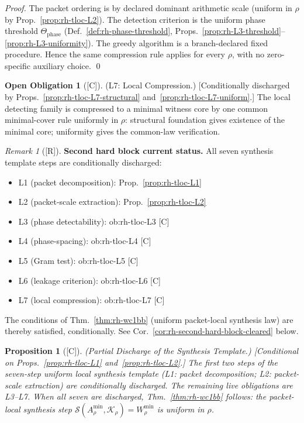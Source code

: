 \documentclass[12pt,oneside]{amsbook}
\theoremstyle{plain}
\newtheorem{proposition}[theorem]{Proposition}
\theoremstyle{definition}
\newtheorem{obligation}[theorem]{Open Obligation}
\theoremstyle{remark}
\newtheorem{remark}[theorem]{Remark}
\newcommand{\status}[1]{\textup{[#1]}}
\begin{document}
\begin{proof}
The packet ordering is by declared dominant arithmetic scale
(uniform in $\rho$ by Prop.~\ref{prop:rh-tloc-L2}). The detection
criterion is the uniform phase threshold
$\Theta_{\mathrm{phase}}$ (Def.~\ref{def:rh-phase-threshold},
Props.~\ref{prop:rh-L3-threshold}--\ref{prop:rh-L3-uniformity}).
The greedy algorithm is a branch-declared fixed procedure. Hence
the same compression rule applies for every $\rho$,
with no zero-specific auxiliary choice. \qed
\end{proof}

\begin{obligation}[\status{C}]\label{ob:rh-tloc-L7}
\textup{(L7: Local Compression.)}
\textup{[Conditionally discharged by
Props.~\ref{prop:rh-tloc-L7-structural}
and~\ref{prop:rh-tloc-L7-uniform}.]}
The local detecting family is compressed to a minimal witness core by
one common minimal-cover rule uniformly in $\rho$: structural
foundation gives existence of the minimal core; uniformity gives the
common-law verification.
\end{obligation}

\begin{remark}[\status{R}]\label{rem:rh-second-hinge-status}
\textbf{Second hard block current status.}
All seven synthesis template steps are conditionally discharged:
\begin{itemize}
 \item L1 (packet decomposition): Prop.~\ref{prop:rh-tloc-L1} \checkmark
 \item L2 (packet-scale extraction): Prop.~\ref{prop:rh-tloc-L2} \checkmark
 \item L3 (phase detectability): ob:rh-tloc-L3 [C] \checkmark
 \item L4 (phase-spacing): ob:rh-tloc-L4 [C] \checkmark
 \item L5 (Gram test): ob:rh-tloc-L5 [C] \checkmark
 \item L6 (leakage criterion): ob:rh-tloc-L6 [C] \checkmark
 \item L7 (local compression): ob:rh-tloc-L7 [C] \checkmark
\end{itemize}
The conditions of Thm.~\ref{thm:rh-wc1bb} (uniform packet-local
synthesis law) are thereby satisfied, conditionally. See
Cor.~\ref{cor:rh-second-hard-block-cleared} below.
\end{remark}

\begin{proposition}[\status{C}]\label{prop:rh-wc1bb-L12-partial}
\textup{(Partial Discharge of the Synthesis Template.)}
\textup{[Conditional on Props.~\ref{prop:rh-tloc-L1}
and~\ref{prop:rh-tloc-L2}.]}
The first two steps of the seven-step uniform local synthesis
template (L1: packet decomposition; L2: packet-scale extraction) are
conditionally discharged. The remaining live obligations are L3--L7.
When all seven are discharged, Thm.~\ref{thm:rh-wc1bb} follows:
the packet-local synthesis step
$\mathcal{S}(A_\rho^{\min}, \mathcal{K}_\rho) = W_\rho^{\min}$
is uniform in $\rho$.
\end{proposition}
\end{document}
